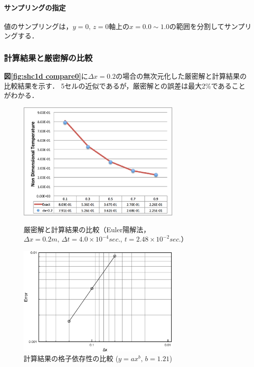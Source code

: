 \paragraph{サンプリングの指定}
値のサンプリングは，$y=0,\, z=0$軸上の$x=0.0\sim 1.0$の範囲を分割してサンプリングする．



%
\subsubsection{計算結果と厳密解の比較}

\textbf{図\ref{fig:shc1d compare0}}に$\Delta x=0.2$の場合の無次元化した厳密解と計算結果の比較結果を示す．
5セルの近似であるが，厳密解との誤差は最大2\%であることがわかる．

\begin{figure}[htbp]
\begin{minipage}{.47\textwidth}
\begin{center}
\includegraphics[width=8cm,clip]{cmp_0.eps}
\end{center}
\caption{厳密解と計算結果の比較（Euler陽解法，$\Delta x=0.2 m,\,\Delta t=4.0\times 10^{-4} sec.$, $t=2.48\times 10^{-2} sec.$）}
\label{fig:shc1d compare0}
\end{minipage} \hfill
\begin{minipage}{.47\textwidth}
\begin{center}
\includegraphics[width=8cm,clip]{error.eps}
\end{center}
\caption{計算結果の格子依存性の比較 ($y=ax^b,\,b=1.21$)}
\label{fig:shc1d compare1}
\end{minipage}
\end{figure}


